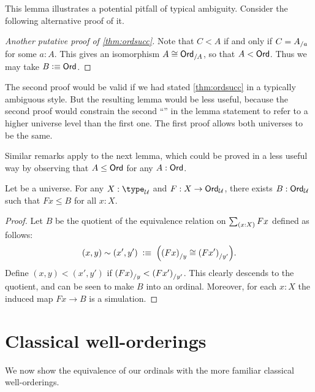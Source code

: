 This lemma illustrates a potential pitfall of typical ambiguity.
Consider the following alternative proof of it.

\begin{proof}[Another putative proof of \autoref{thm:ordsucc}]
  Note that $C<A$ if and only if $C={A}_{/a}$ for some $a:A$.
  This gives an isomorphism $A \cong {\ensuremath{\mathsf{Ord}}}_{/A}$, so that $A<\mathsf{Ord}$.
  Thus we may take $B\vcentcolon\equiv\mathsf{Ord}$.
\end{proof}

The second proof would be valid if we had stated \autoref{thm:ordsucc} in a typically ambiguous style.
But the resulting lemma would be less useful, because the second proof would constrain the second ``\ord'' in the lemma statement to refer to a higher universe level than the first one.
The first proof allows both universes to be the same.

Similar remarks apply to the next lemma, which could be proved in a less useful way by observing that $A\le \mathsf{Ord}$ for any $A:\mathsf{Ord}$.

\begin{lem}\label{thm:ordunion}
  Let \bbU be a universe.
  For any $X:\type_\bbU$ and $F:X\to \mathsf{Ord}_\mathcal{U}$, there exists $B:\mathsf{Ord}_\mathcal{U}$ such that $Fx\le B$ for all $x:X$.
\end{lem}
\begin{proof}
  Let $B$ be the quotient of the equivalence relation on $\sm{x:X} Fx$ defined as follows:
  \[ (x,y) \sim (x',y')
  \;\vcentcolon\equiv\;
  \Big({(Fx)}_{/y} \cong {(Fx')}_{/y'}\Big).
  \]
  Define $(x,y)<(x',y')$ if ${(Fx)}_{/y} < {(Fx')}_{/y'}$.
  This clearly descends to the quotient, and can be seen to make $B$ into an ordinal.
  Moreover, for each $x:X$ the induced map $Fx\to B$ is a simulation.
\end{proof}



\section{Classical well-orderings}
\label{sec:wellorderings}

We now show the equivalence of our ordinals with the more familiar classical well-orderings.


